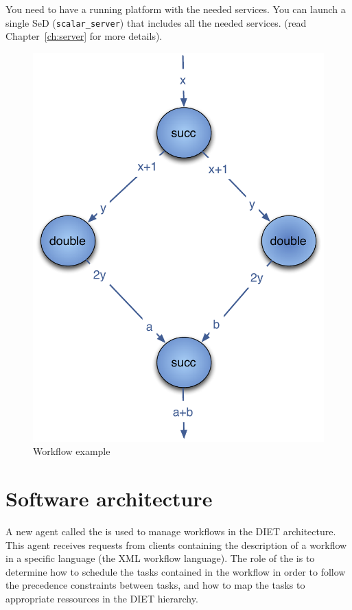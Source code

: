 You need to have a running \diet platform with the needed services. You
can launch a single SeD (\texttt{scalar\_server}) that includes all the
needed services. (read Chapter~\ref{ch:server} for more details).

\begin{figure}[htbp]
  \centering
  \includegraphics[keepaspectratio,width=0.4\linewidth]{fig/wf_example1}
  \caption{Workflow example}
  \label{fig:example1}
\end{figure}

\section{Software architecture}


A new agent called the \textit{\madag} is used to manage workflows
in the DIET architecture. This agent receives requests from clients
containing the description of a workflow in a specific language
(the \madag XML workflow language). The role of the \madag is to
determine how to schedule the tasks contained in the workflow in
order to follow the precedence constraints between tasks, and how to
map the tasks to appropriate ressources in the DIET hierarchy.

